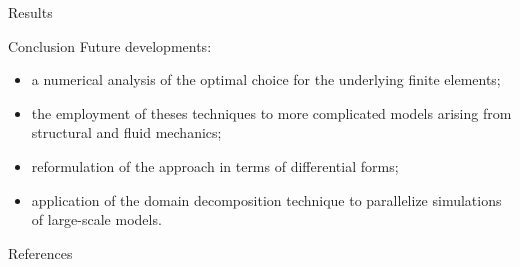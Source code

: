 \documentclass[aspectratio=169]{ISAE-Beamer}
\begin{document}
\begin{frame}[fragile]{Results}

\end{frame}

\begin{frame}{Conclusion}
Future developments:
\begin{itemize}
\item a numerical analysis of the optimal choice for the underlying finite elements;
\item  the employment of theses techniques to more complicated models arising from structural and fluid mechanics;
\item reformulation of the approach in terms of differential forms;
\item application of the domain decomposition technique to parallelize simulations of large-scale models.
\end{itemize}
\vspace{1cm}
\end{frame}

\begin{frame}[allowframebreaks]{References}
\nocite{*}
\printbibliography
\end{frame}
\end{document}
